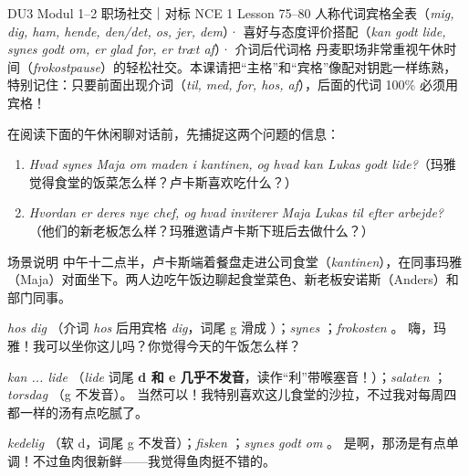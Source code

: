 {DU3 Modul 1--2 职场社交｜对标 NCE 1 Lesson 75--80}
{人称代词宾格全表（\textit{mig, dig, ham, hende, den/det, os, jer, dem}）· 喜好与态度评价搭配（\textit{kan godt lide, synes godt om, er glad for, er træt af}）· 介词后代词格}
{丹麦职场非常重视午休时间（\textit{frokostpause}）的轻松社交。本课请把“主格”和“宾格”像配对钥匙一样练熟，特别记住：只要前面出现介词（\textit{til, med, for, hos, af}），后面的代词 100\% 必须用宾格！}

\begin{foerduleaeser}
在阅读下面的午休闲聊对话前，先捕捉这两个问题的信息：
\begin{enumerate}
  \item \textit{Hvad synes Maja om maden i kantinen, og hvad kan Lukas godt lide?}（玛雅觉得食堂的饭菜怎么样？卢卡斯喜欢吃什么？）
  \item \textit{Hvordan er deres nye chef, og hvad inviterer Maja Lukas til efter arbejde?}（他们的新老板怎么样？玛雅邀请卢卡斯下班后去做什么？）
\end{enumerate}
\end{foerduleaeser}


\begin{tipbox}{场景说明}
中午十二点半，卢卡斯端着餐盘走进公司食堂（\textit{kantinen}），在同事玛雅（Maja）对面坐下。两人边吃午饭边聊起食堂菜色、新老板安诺斯（Anders）和部门同事。
\end{tipbox}

{\textit{hos dig} （介词 \textit{hos} 后用宾格 \textit{dig}，词尾 g 滑成 ）；\textit{synes} ；\textit{frokosten} 。}
{嗨，玛雅！我可以坐你这儿吗？你觉得今天的午饭怎么样？}

{\textit{kan ... lide} （\textit{lide} 词尾 \textbf{d 和 e 几乎不发音}，读作“利”带喉塞音！）；\textit{salaten} ；\textit{torsdag} （g 不发音）。}
{当然可以！我特别喜欢这儿食堂的沙拉，不过我对每周四都一样的汤有点吃腻了。}

{\textit{kedelig} （软 d，词尾 g 不发音）；\textit{fisken} ；\textit{synes godt om} 。}
{是啊，那汤是有点单调！不过鱼肉很新鲜——我觉得鱼肉挺不错的。}

